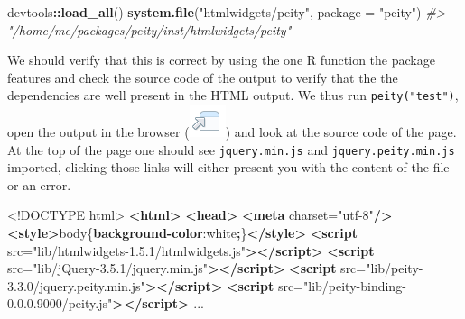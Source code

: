\documentclass[
]{krantz}
\makeatletter
\newenvironment{Shaded}{\begin{snugshade}}{\end{snugshade}}
\newcommand{\CommentTok}[1]{\textcolor[rgb]{0.37,0.37,0.37}{\textit{#1}}}
\newcommand{\ConstantTok}[1]{\textcolor[rgb]{0,0,0}{#1}}
\newcommand{\DataTypeTok}[1]{\textcolor[rgb]{0.27,0.27,0.27}{#1}}
\newcommand{\KeywordTok}[1]{\textcolor[rgb]{0.27,0.27,0.27}{\textbf{#1}}}
\newcommand{\NormalTok}[1]{#1}
\newcommand{\OperatorTok}[1]{\textcolor[rgb]{0.43,0.43,0.43}{\textbf{#1}}}
\newcommand{\OtherTok}[1]{\textcolor[rgb]{0.37,0.37,0.37}{#1}}
\newcommand{\StringTok}[1]{\textcolor[rgb]{0.5,0.5,0.5}{#1}}
\newenvironment{kframe}{%
\medskip{}
\setlength{\fboxsep}{.8em}
 \def\at@end@of@kframe{}%
 \ifinner\ifhmode%
  \def\at@end@of@kframe{\end{minipage}}%
  \begin{minipage}{\columnwidth}%
 \fi\fi%
 \def\FrameCommand##1{\hskip\@totalleftmargin \hskip-\fboxsep
 \colorbox{shadecolor}{##1}\hskip-\fboxsep
     \hskip-\linewidth \hskip-\@totalleftmargin \hskip\columnwidth}%
 \MakeFramed {\advance\hsize-\width
   \@totalleftmargin\z@ \linewidth\hsize
   \@setminipage}}%
 {\par\unskip\endMakeFramed%
 \at@end@of@kframe}
\renewenvironment{Shaded}{\begin{kframe}}{\end{kframe}}
\makeatother
\begin{document}
\begin{Shaded}
\begin{Highlighting}[]
\NormalTok{devtools}\OperatorTok{::}\KeywordTok{load\_all}\NormalTok{()}
\KeywordTok{system.file}\NormalTok{(}\StringTok{"htmlwidgets/peity"}\NormalTok{, }\DataTypeTok{package =} \StringTok{"peity"}\NormalTok{)                                         }
\CommentTok{\#\textgreater{} "/home/me/packages/peity/inst/htmlwidgets/peity"}
\end{Highlighting}
\end{Shaded}

We should verify that this is correct by using the one R function the package features and check the source code of the output to verify that the the dependencies are well present in the HTML output. We thus run \texttt{peity("test")}, open the output in the browser (\includegraphics{images/open-in-browser.png}) and look at the source code of the page. At the top of the page one should see \texttt{jquery.min.js} and \texttt{jquery.peity.min.js} imported, clicking those links will either present you with the content of the file or an error.

\begin{Shaded}
\begin{Highlighting}[]
\DataTypeTok{\textless{}!DOCTYPE }\NormalTok{html}\DataTypeTok{\textgreater{}}
\KeywordTok{\textless{}html\textgreater{}}
\KeywordTok{\textless{}head\textgreater{}}
\KeywordTok{\textless{}meta}\OtherTok{ charset=}\StringTok{"utf{-}8"}\KeywordTok{/\textgreater{}}
\KeywordTok{\textless{}style\textgreater{}}\NormalTok{body\{}\KeywordTok{background{-}color}\NormalTok{:}\ConstantTok{white}\OperatorTok{;}\NormalTok{\}}\KeywordTok{\textless{}/style\textgreater{}}
\KeywordTok{\textless{}script}\OtherTok{ src=}\StringTok{"lib/htmlwidgets{-}1.5.1/htmlwidgets.js"}\KeywordTok{\textgreater{}\textless{}/script\textgreater{}}
\KeywordTok{\textless{}script}\OtherTok{ src=}\StringTok{"lib/jQuery{-}3.5.1/jquery.min.js"}\KeywordTok{\textgreater{}\textless{}/script\textgreater{}}
\KeywordTok{\textless{}script}\OtherTok{ src=}\StringTok{"lib/peity{-}3.3.0/jquery.peity.min.js"}\KeywordTok{\textgreater{}\textless{}/script\textgreater{}}
\KeywordTok{\textless{}script}\OtherTok{ src=}\StringTok{"lib/peity{-}binding{-}0.0.0.9000/peity.js"}\KeywordTok{\textgreater{}\textless{}/script\textgreater{}}
\NormalTok{...}
\end{Highlighting}
\end{Shaded}
\end{document}
